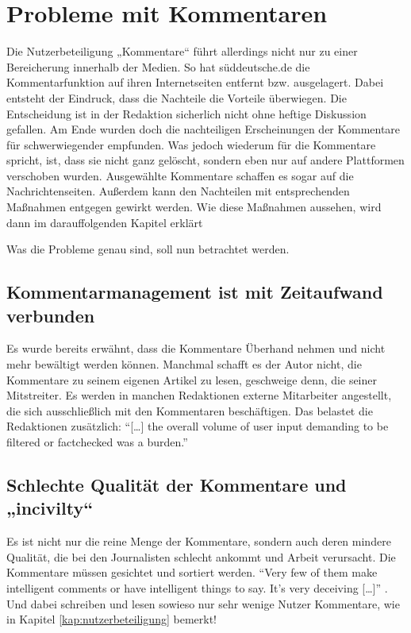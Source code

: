 \chapter{Probleme mit Kommentaren}

Die Nutzerbeteiligung „Kommentare“ führt allerdings nicht nur zu einer
Bereicherung innerhalb der Medien. So hat süddeutsche.de die Kommentarfunktion
auf ihren Internetseiten entfernt bzw. ausgelagert. Dabei entsteht der Eindruck,
dass die Nachteile die Vorteile überwiegen. Die Entscheidung ist in der
Redaktion sicherlich nicht ohne heftige Diskussion gefallen. Am Ende wurden doch
die nachteiligen Erscheinungen der Kommentare für schwerwiegender empfunden. Was
jedoch wiederum für die Kommentare spricht, ist, dass sie nicht ganz gelöscht,
sondern eben nur auf andere Plattformen verschoben wurden. Ausgewählte
Kommentare schaffen es sogar auf die Nachrichtenseiten. Außerdem kann den
Nachteilen mit entsprechenden Maßnahmen entgegen gewirkt werden. Wie diese
Maßnahmen aussehen, wird dann im darauffolgenden Kapitel erklärt

Was die Probleme genau sind, soll nun betrachtet werden.

\section{Kommentarmanagement ist mit Zeitaufwand verbunden}

Es wurde bereits erwähnt, dass die Kommentare Überhand nehmen und nicht mehr
bewältigt werden können. Manchmal schafft es der Autor nicht, die Kommentare zu
seinem eigenen Artikel zu lesen, geschweige denn, die seiner Mitstreiter. Es
werden in manchen Redaktionen externe Mitarbeiter angestellt, die sich
ausschließlich mit den Kommentaren beschäftigen. Das belastet die Redaktionen
zusätzlich: ``[\ldots] the overall volume of user input demanding to be filtered
or factchecked was a burden.'' \autocite[S.~172]{quandt}


\section{Schlechte Qualität der Kommentare und „incivilty“}

Es ist nicht nur die reine Menge der Kommentare, sondern auch deren mindere
Qualität, die bei den Journalisten schlecht ankommt und Arbeit verursacht. Die
Kommentare müssen gesichtet und sortiert werden. ``Very few of them make
intelligent comments or have intelligent things to say. It's very deceiving
[\ldots]'' \autocite[S.~ 103]{reich}. Und dabei schreiben und lesen sowieso nur
sehr wenige Nutzer Kommentare, wie in Kapitel \ref{kap:nutzerbeteiligung}
bemerkt!

